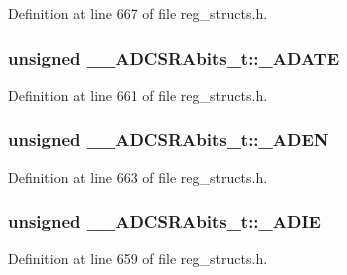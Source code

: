 Definition at line 667 of file reg\+\_\+structs.\+h.

\hypertarget{union_____a_d_c_s_r_abits__t_a7d65a784992e54d7eb71421f3998ef05}{
\subsubsection[{\+\_\+\+A\+D\+A\+T\+E}]{\setlength{\rightskip}{0pt plus 5cm}unsigned \+\_\+\+\_\+\+A\+D\+C\+S\+R\+Abits\+\_\+t\+::\+\_\+\+A\+D\+A\+T\+E}}\label{union_____a_d_c_s_r_abits__t_a7d65a784992e54d7eb71421f3998ef05}


Definition at line 661 of file reg\+\_\+structs.\+h.

\hypertarget{union_____a_d_c_s_r_abits__t_a624900a5c9c7dc231ef529da387913ee}{
\subsubsection[{\+\_\+\+A\+D\+E\+N}]{\setlength{\rightskip}{0pt plus 5cm}unsigned \+\_\+\+\_\+\+A\+D\+C\+S\+R\+Abits\+\_\+t\+::\+\_\+\+A\+D\+E\+N}}\label{union_____a_d_c_s_r_abits__t_a624900a5c9c7dc231ef529da387913ee}


Definition at line 663 of file reg\+\_\+structs.\+h.

\hypertarget{union_____a_d_c_s_r_abits__t_a4dddc0cc11f9d46ab69387c46b086645}{
\subsubsection[{\+\_\+\+A\+D\+I\+E}]{\setlength{\rightskip}{0pt plus 5cm}unsigned \+\_\+\+\_\+\+A\+D\+C\+S\+R\+Abits\+\_\+t\+::\+\_\+\+A\+D\+I\+E}}\label{union_____a_d_c_s_r_abits__t_a4dddc0cc11f9d46ab69387c46b086645}


Definition at line 659 of file reg\+\_\+structs.\+h.

